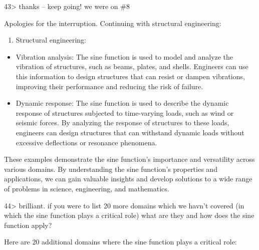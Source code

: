 \documentclass[
]{article}
\providecommand{\tightlist}{%
  \setlength{\itemsep}{0pt}\setlength{\parskip}{0pt}}
\begin{document}
43\textgreater{} thanks -- keep going! we were on \#8

Apologies for the interruption. Continuing with structural engineering:

\begin{enumerate}
\def\labelenumi{\arabic{enumi}.}
\setcounter{enumi}{7}
\tightlist
\item
  Structural engineering:
\end{enumerate}

\begin{itemize}
\item
  Vibration analysis: The sine function is used to model and analyze the
  vibration of structures, such as beams, plates, and shells. Engineers
  can use this information to design structures that can resist or
  dampen vibrations, improving their performance and reducing the risk
  of failure.
\item
  Dynamic response: The sine function is used to describe the dynamic
  response of structures subjected to time-varying loads, such as wind
  or seismic forces. By analyzing the response of structures to these
  loads, engineers can design structures that can withstand dynamic
  loads without excessive deflections or resonance phenomena.
\end{itemize}

These examples demonstrate the sine function's importance and
versatility across various domains. By understanding the sine function's
properties and applications, we can gain valuable insights and develop
solutions to a wide range of problems in science, engineering, and
mathematics.

44\textgreater{} brilliant. if you were to list 20 more domains which we
havn't covered (in which the sine function plays a critical role) what
are they and how does the sine function apply?

Here are 20 additional domains where the sine function plays a critical
role:
\end{document}
